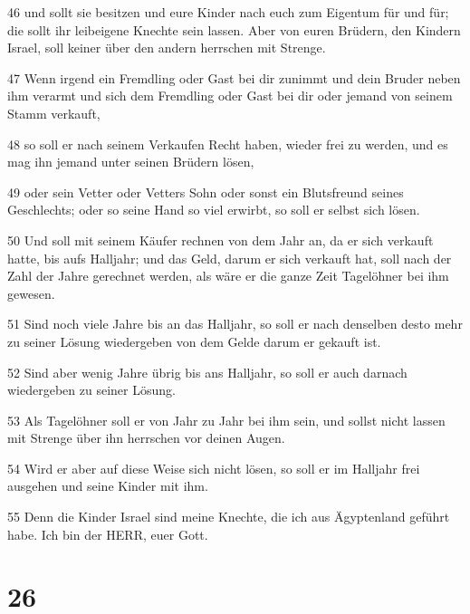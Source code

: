 \par 46 und sollt sie besitzen und eure Kinder nach euch zum Eigentum für und für; die sollt ihr leibeigene Knechte sein lassen. Aber von euren Brüdern, den Kindern Israel, soll keiner über den andern herrschen mit Strenge.
\par 47 Wenn irgend ein Fremdling oder Gast bei dir zunimmt und dein Bruder neben ihm verarmt und sich dem Fremdling oder Gast bei dir oder jemand von seinem Stamm verkauft,
\par 48 so soll er nach seinem Verkaufen Recht haben, wieder frei zu werden, und es mag ihn jemand unter seinen Brüdern lösen,
\par 49 oder sein Vetter oder Vetters Sohn oder sonst ein Blutsfreund seines Geschlechts; oder so seine Hand so viel erwirbt, so soll er selbst sich lösen.
\par 50 Und soll mit seinem Käufer rechnen von dem Jahr an, da er sich verkauft hatte, bis aufs Halljahr; und das Geld, darum er sich verkauft hat, soll nach der Zahl der Jahre gerechnet werden, als wäre er die ganze Zeit Tagelöhner bei ihm gewesen.
\par 51 Sind noch viele Jahre bis an das Halljahr, so soll er nach denselben desto mehr zu seiner Lösung wiedergeben von dem Gelde darum er gekauft ist.
\par 52 Sind aber wenig Jahre übrig bis ans Halljahr, so soll er auch darnach wiedergeben zu seiner Lösung.
\par 53 Als Tagelöhner soll er von Jahr zu Jahr bei ihm sein, und sollst nicht lassen mit Strenge über ihn herrschen vor deinen Augen.
\par 54 Wird er aber auf diese Weise sich nicht lösen, so soll er im Halljahr frei ausgehen und seine Kinder mit ihm.
\par 55 Denn die Kinder Israel sind meine Knechte, die ich aus Ägyptenland geführt habe. Ich bin der HERR, euer Gott.

\chapter{26}

